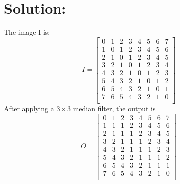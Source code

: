 \documentclass[12pt]{article}
\begin{document}
\vfill
\clearpage
\section{Solution:}
The image I is:
\begin{equation*}
I={\left[ \begin{array}{cccccccc}
0 & 1 & 2 & 3 & 4 & 5 & 6 & 7\\
1 & 0 & 1 & 2 & 3 & 4 & 5 & 6\\
2 & 1 & 0 & 1 & 2 & 3 & 4 & 5\\
3 & 2 & 1 & 0 & 1 & 2 & 3 & 4\\
4 & 3 & 2 & 1 & 0 & 1 & 2 & 3\\
5 & 4 & 3 & 2 & 1 & 0 & 1 & 2\\
6 & 5 & 4 & 3 & 2 & 1 & 0 & 1\\
7 & 6 & 5 & 4 & 3 & 2 & 1 & 0\\
\end{array} \right]}
\end{equation*}
After applying a $3\times3$ median filter, the output is 
\begin{equation*}
O={\left[ \begin{array}{cccccccc}
0 & 1 & 2 & 3 & 4 & 5 & 6 & 7\\
1 & 1 & 1 & 2 & 3 & 4 & 5 & 6\\
2 & 1 & 1 & 1 & 2 & 3 & 4 & 5\\
3 & 2 & 1 & 1 & 1 & 2 & 3 & 4\\
4 & 3 & 2 & 1 & 1 & 1 & 2 & 3\\
5 & 4 & 3 & 2 & 1 & 1 & 1 & 2\\
6 & 5 & 4 & 3 & 2 & 1 & 1 & 1\\
7 & 6 & 5 & 4 & 3 & 2 & 1 & 0\\
\end{array} \right]}
\end{equation*}

\end{document}
